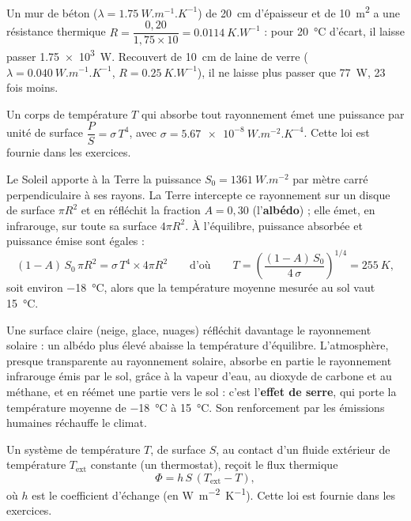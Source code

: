 \begin{exemple}
Un mur de béton ($\lambda=\qty{1,75}{W.m^{-1}.K^{-1}}$) de \qty{20}{cm} d'épaisseur et de \qty{10}{m^2} a une résistance thermique
$R=\dfrac{0{,}20}{1{,}75\times10}=\qty{0,0114}{K.W^{-1}}$ : pour \qty{20}{\degreeCelsius} d'écart, il laisse passer
\qty{1,75e3}{W}. Recouvert de \qty{10}{cm} de laine de verre ($\lambda=\qty{0,040}{W.m^{-1}.K^{-1}}$, $R=\qty{0,25}{K.W^{-1}}$), il ne
laisse plus passer que \qty{77}{W}, 23 fois moins.
\end{exemple}
\begin{loi}
Un corps de température $T$ qui absorbe tout rayonnement émet une puissance par unité de surface
$\dfrac{P}{S}=\sigma\,T^4$, avec $\sigma=\qty{5,67e-8}{W.m^{-2}.K^{-4}}$. Cette loi est fournie dans les exercices.
\end{loi}
\begin{savoirfaire}
Le Soleil apporte à la Terre la puissance $S_0=\qty{1361}{W.m^{-2}}$ par mètre carré perpendiculaire à ses rayons. La Terre
intercepte ce rayonnement sur un disque de surface $\pi R^2$ et en réfléchit la fraction $A=0{,}30$ (l'\textbf{albédo}) ;
elle émet, en infrarouge, sur toute sa surface $4\pi R^2$. À l'équilibre, puissance absorbée et puissance émise sont
égales :
\[(1-A)\,S_0\,\pi R^2=\sigma\,T^4\times4\pi R^2\qquad\text{d'où}\qquad T=\left(\frac{(1-A)\,S_0}{4\,\sigma}\right)^{1/4}=\qty{255}{K},\]
soit environ \qty{-18}{\degreeCelsius}, alors que la température moyenne mesurée au sol vaut \qty{15}{\degreeCelsius}.
\end{savoirfaire}
\begin{propriete}
Une surface claire (neige, glace, nuages) réfléchit davantage le rayonnement solaire : un albédo plus élevé abaisse
la température d'équilibre. L'atmosphère, presque transparente au rayonnement solaire, absorbe en partie le
rayonnement infrarouge émis par le sol, grâce à la vapeur d'eau, au dioxyde de carbone et au méthane, et en réémet
une partie vers le sol : c'est l'\textbf{effet de serre}, qui porte la température moyenne de \qty{-18}{\degreeCelsius} à
\qty{15}{\degreeCelsius}. Son renforcement par les émissions humaines réchauffe le climat.
\end{propriete}
\begin{loi}
Un système de température $T$, de surface $S$, au contact d'un fluide extérieur de température $T_\mathrm{ext}$ constante
(un thermostat), reçoit le flux thermique
\[\Phi=h\,S\,(T_\mathrm{ext}-T),\]
où $h$ est le coefficient d'échange (en \unit{W.m^{-2}.K^{-1}}). Cette loi est fournie dans les exercices.
\end{loi}
